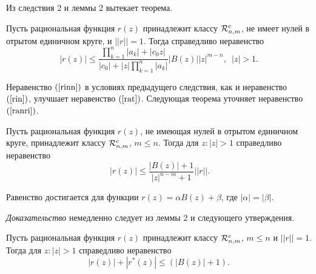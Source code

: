 \documentclass[a4paper,12pt,twoside]{article}
\begin{document}
Из следствия 2 и леммы 2 вытекает теорема.

\begin{thm} Пусть рациональная функция $r(z)$ принадлежит классу ${\cal
R}_{n,m}^c$, не имеет нулей в отрытом единичном круге, и
$||r||=1$. Тогда справедливо неравенство
\begin{equation}\label{rinn}
 |r(z)|\leq \frac{\displaystyle
\prod\limits_{k=1}^{n}|a_k|+|c_0z|}{\displaystyle
|c_0|+|z|\prod\limits_{k=1}^{n}|a_k|}|B(z)||z|^{m-n}, \, \, \, |z|>1.
\end{equation}
\end{thm}


Неравенство $(\ref{rinn})$ в условиях предыдущего следствия, как и
неравенство $(\ref{rin})$, улучшает неравенство $(\ref{rat})$.
Следующая теорема уточняет неравенство $(\ref{ranri})$.


\begin{thm} Пусть рациональная функция $r(z)$, не имеющая нулей в
отрытом единичном круге, принадлежит классу ${\cal R}_{n,m}^c$,
$m\leq n$. Тогда для $z: |z|>1$ справедливо неравенство
$$\
|r(z)|\leq \frac{|B(z)|+1}{|z|^{n-m}+1}||r||.
$$

Равенство достигается для функции $r(z)=\alpha B(z)+\beta$, где
$|\alpha|=|\beta|$. \end{thm}

{\it Доказательство} немедленно следует из леммы 2 и следующего
утверждения.

 \begin{lem} {\rm \cite{Gov}}
 Пусть рациональная функция $r(z)$ принадлежит классу ${\cal
R}_{n,m}^c$, $m\leq n$ и $||r||=1$. Тогда для $z: |z|>1$
справедливо неравенство
$$
|r(z)|+|r^{*}(z)|\leq\left(|B(z)|+1\right).
$$
\end{lem}
\end{document}
